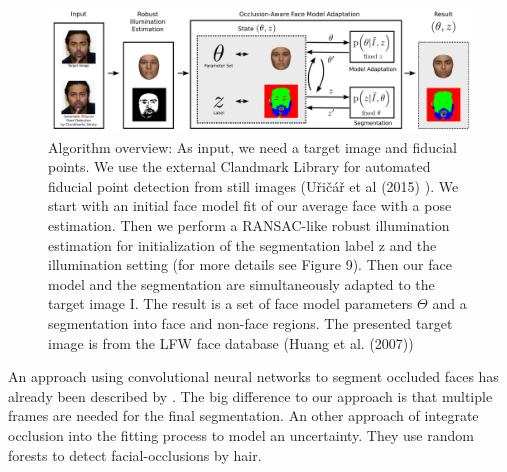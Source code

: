 \begin{figure}
	\centering
	\includegraphics[width=1\linewidth]{Figures/chap1/EGGER's_method.png}
	\caption[caption without footnote, for lof]{\footnotemark Algorithm overview: As input, we need a target image and fiducial points. We use the external Clandmark Library for automated fiducial point detection from still images (U\v ri\v c\' a\v r et al (2015) \cite{Uricar}). We start with an initial face model fit of our average face with a pose estimation. Then we perform a RANSAC-like robust illumination estimation for initialization of the segmentation label z and the illumination setting (for more details see Figure 9). Then our face model and the segmentation are simultaneously adapted to the target image I. The result is a set of face model parameters $\Theta$ and a segmentation into face and non-face regions. The presented target image is from the LFW face database (Huang et al. (2007))}
	\label{fig:EGGER's_method}
\end{figure}


An approach using convolutional neural networks to segment occluded faces has already been described by \cite{SaitoEtAl}. The big difference to our approach is that multiple frames are needed for the final segmentation. An other approach of \cite{MorelForster} integrate occlusion into the fitting process to model an uncertainty. They use random forests to detect facial-occlusions by hair.

